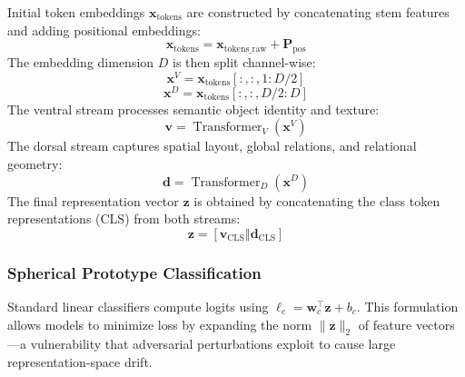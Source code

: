 \documentclass[12pt,a4paper]{article}
\begin{document}
Initial token embeddings $\mathbf{x}_{\mathrm{tokens}}$ are constructed by concatenating stem features and adding positional embeddings:
\begin{equation}
  \mathbf{x}_{\mathrm{tokens}} = \mathbf{x}_{\mathrm{tokens\_raw}} + \mathbf{P}_{\mathrm{pos}}
\end{equation}
The embedding dimension $D$ is then split channel-wise:
\begin{equation}
  \mathbf{x}^{V} = \mathbf{x}_{\mathrm{tokens}}[:, :, 1:D/2]
\end{equation}
\begin{equation}
  \mathbf{x}^{D} = \mathbf{x}_{\mathrm{tokens}}[:, :, D/2:D]
\end{equation}
The ventral stream processes semantic object identity and texture:
\begin{equation}
  \mathbf{v} = \operatorname{Transformer}_{V}(\mathbf{x}^{V})
\end{equation}
The dorsal stream captures spatial layout, global relations, and relational geometry:
\begin{equation}
  \mathbf{d} = \operatorname{Transformer}_{D}(\mathbf{x}^{D})
\end{equation}
The final representation vector $\mathbf{z}$ is obtained by concatenating the class token representations ($\text{CLS}$) from both streams:
\begin{equation}
  \mathbf{z} = \left[\mathbf{v}_{\mathrm{CLS}} \mathbin{\Vert} \mathbf{d}_{\mathrm{CLS}}\right]
\end{equation}

\subsubsection{Spherical Prototype Classification}
Standard linear classifiers compute logits using $\ell_c = \mathbf{w}_c^\top \mathbf{z} + b_c$. This formulation allows models to minimize loss by expanding the norm $\|\mathbf{z}\|_2$ of feature vectors—a vulnerability that adversarial perturbations exploit to cause large representation-space drift.
\end{document}

